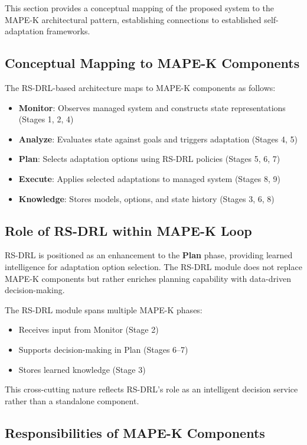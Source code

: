 \documentclass[11pt,a4paper]{article}
\begin{document}
This section provides a conceptual mapping of the proposed system to the MAPE-K architectural pattern, establishing connections to established self-adaptation frameworks.

\subsection{Conceptual Mapping to MAPE-K Components}

The RS-DRL-based architecture maps to MAPE-K components as follows:

\begin{itemize}
    \item \textbf{Monitor}: Observes managed system and constructs state representations (Stages 1, 2, 4)
    \item \textbf{Analyze}: Evaluates state against goals and triggers adaptation (Stages 4, 5)
    \item \textbf{Plan}: Selects adaptation options using RS-DRL policies (Stages 5, 6, 7)
    \item \textbf{Execute}: Applies selected adaptations to managed system (Stages 8, 9)
    \item \textbf{Knowledge}: Stores models, options, and state history (Stages 3, 6, 8)
\end{itemize}

\subsection{Role of RS-DRL within MAPE-K Loop}

RS-DRL is positioned as an enhancement to the \textbf{Plan} phase, providing learned intelligence for adaptation option selection. The RS-DRL module does not replace MAPE-K components but rather enriches planning capability with data-driven decision-making.

The RS-DRL module spans multiple MAPE-K phases:
\begin{itemize}
    \item Receives input from Monitor (Stage 2)
    \item Supports decision-making in Plan (Stages 6--7)
    \item Stores learned knowledge (Stage 3)
\end{itemize}

This cross-cutting nature reflects RS-DRL's role as an intelligent decision service rather than a standalone component.

\subsection{Responsibilities of MAPE-K Components}
\end{document}
